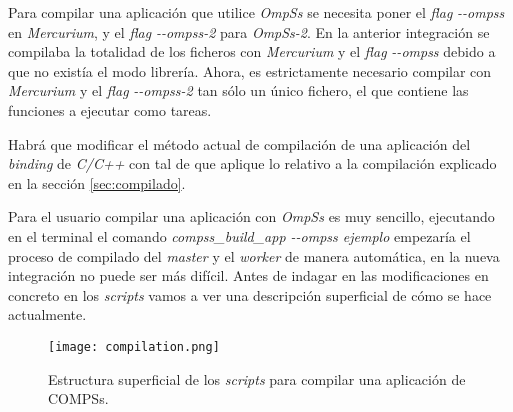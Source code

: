 Para compilar una aplicación que utilice \textit{OmpSs} se necesita poner el \textit{flag} \textit{-{}-ompss} en \textit{Mercurium}, y el \textit{flag} \textit{-{}-ompss-2} para \textit{OmpSs-2}. En la anterior integración se compilaba la totalidad de los ficheros con \textit{Mercurium} y el \textit{flag} \textit{-{}-ompss} debido a que no existía el modo librería. Ahora, es estrictamente necesario compilar con \textit{Mercurium} y el \textit{flag} \textit{-{}-ompss-2} tan sólo un único fichero, el que contiene las funciones a ejecutar como tareas. 
\par\bigskip
Habrá que modificar el método actual de compilación de una aplicación del \textit{binding} de \textit{C/C++} con tal de que aplique lo relativo a la compilación explicado en la sección \ref{sec:compilado}.
\par\bigskip

Para el usuario compilar una aplicación con \textit{OmpSs} es muy sencillo, ejecutando en el terminal el comando \textit{compss\_build\_app -{}-ompss ejemplo} empezaría el proceso de compilado del \textit{master} y el \textit{worker} de manera automática, en la nueva integración no puede ser más difícil. Antes de indagar en las modificaciones en concreto en los \textit{scripts} vamos a ver una descripción superficial de cómo se hace actualmente.

\begin{figure}[H]
    \centering 
    \caption{Estructura superficial de los \textit{scripts} para compilar una aplicación de COMPSs.}
    \texttt{[image: compilation.png]}
    \label{fig:compilado}
\end{figure}

